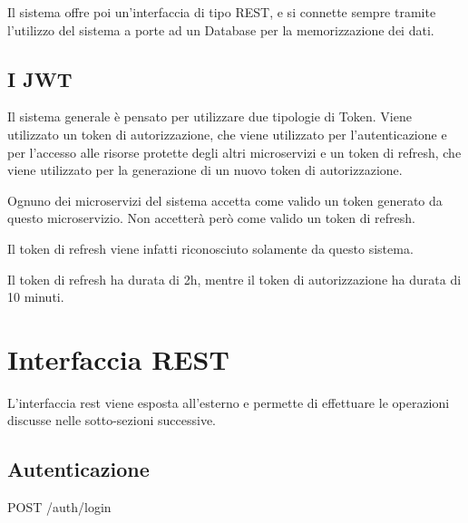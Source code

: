 Il sistema offre poi un'interfaccia di tipo REST, e si connette sempre tramite l'utilizzo del sistema a porte ad un Database per la memorizzazione dei dati.

\subsection{I JWT}

Il sistema generale è pensato per utilizzare due tipologie di Token. Viene utilizzato un token di autorizzazione, che viene utilizzato per l'autenticazione e per l'accesso alle risorse protette degli altri microservizi e un token di refresh, che viene utilizzato per la generazione di un nuovo token di autorizzazione.

Ognuno dei microservizi del sistema accetta come valido un token generato da questo microservizio. Non accetterà però come valido un token di refresh.

Il token di refresh viene infatti riconosciuto solamente da questo sistema.

Il token di refresh ha durata di 2h, mentre il token di autorizzazione ha durata di 10 minuti.

\section{Interfaccia REST}

L'interfaccia rest viene esposta all'esterno e permette di effettuare le operazioni discusse nelle sotto-sezioni successive.

\subsection{Autenticazione}

POST /auth/login
